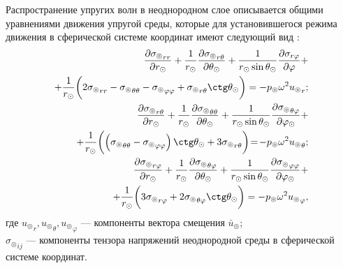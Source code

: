 Распространение упругих волн в неоднородном слое описывается общими уравнениями движения упругой среды, которые для установившегося режима движения в сферической системе координат имеют следующий вид \cite{Nowacki}:
\begin{equation}\label{eq_moving}
\begin{split}
\frac{\partial{\sigma_\circledcirc}_{rr}}{\partial r_\odot} + \frac1{r_\odot} \frac{\partial{\sigma_\circledcirc}_{r\theta}}{\partial\theta_\odot} + \frac{1}{r_\odot\sin\theta_\odot}\frac{\partial\sigma_{r\varphi}}{\partial\varphi} +\\
+ \frac1{r_\odot}\biggl(2{\sigma_\circledcirc}_{rr}-{\sigma_\circledcirc}_{\theta\theta}-{\sigma_\circledcirc}_{\varphi\varphi}+{\sigma_\circledcirc}_{r\theta}\ctg\theta_\odot\biggr)=-p_\circledcirc\omega^2{u_\circledcirc}_r;\\
\frac{\partial{\sigma_\circledcirc}_{r\theta}}{\partial r_\odot} + \frac1{r_\odot} \frac{\partial{\sigma_\circledcirc}_{\theta\theta}}{\partial\theta_\odot} + \frac{1}{r_\odot\sin\theta_\odot}\frac{\partial{\sigma_\circledcirc}_{\theta\varphi}}{\partial\varphi_\odot} +\\
+ \frac1{r_\odot}\biggl(\left({\sigma_\circledcirc}_{\theta\theta}-{\sigma_\circledcirc}_{\varphi\varphi}\right)\ctg\theta_\odot+3{\sigma_\circledcirc}_{r\theta}\biggr)\!=\!-p_\circledcirc\omega^2{u_\circledcirc}_\theta;\\
\frac{\partial{\sigma_\circledcirc}_{r\varphi}}{\partial r_\odot} + \frac1{r_\odot} \frac{\partial{\sigma_\circledcirc}_{\theta\varphi}}{\partial\theta_\odot} + \frac{1}{r_\odot\sin\theta_\odot}\frac{\partial{\sigma_\circledcirc}_{\varphi\varphi}}{\partial\varphi_\odot} +\\
+ \frac1{r_\odot}\biggl(3{\sigma_\circledcirc}_{r\varphi}+2{\sigma_\circledcirc}_{\theta\varphi}\ctg\theta_\odot\biggr)=-p_\circledcirc\omega^2{u_\circledcirc}_\varphi,
\end{split}
\end{equation}
где ${u_\circledcirc}_r, {u_\circledcirc}_\theta, {u_\circledcirc}_\varphi$ --- компоненты вектора смещения $\bar{u}_\circledcirc$;\\
${\sigma_\circledcirc}_{ij}$ --- компоненты тензора напряжений неоднородной среды в сферической системе координат.

